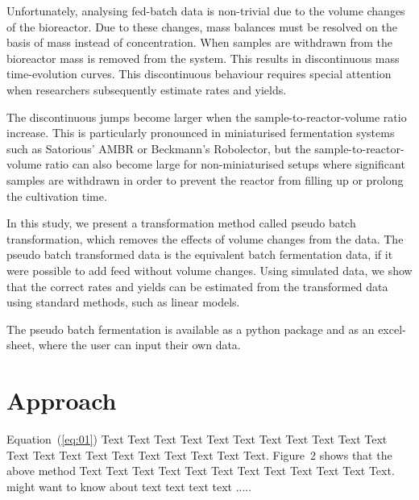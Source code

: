 \documentclass{bioinfo}
\begin{document}
Unfortunately, analysing fed-batch data is non-trivial due to the volume changes of the bioreactor. Due to these changes, mass balances must be resolved on the basis of mass instead of concentration. When samples are withdrawn from the bioreactor mass is removed from the system. This results in discontinuous mass time-evolution curves. This discontinuous behaviour requires special attention when researchers subsequently estimate rates and yields.

The discontinuous jumps become larger when the sample-to-reactor-volume ratio increase. This is particularly pronounced in miniaturised fermentation systems such as Satorious' AMBR or Beckmann's Robolector, but the sample-to-reactor-volume ratio can also become large for non-miniaturised setups where significant samples are withdrawn in order to prevent the reactor from filling up or prolong the cultivation time.

In this study, we present a transformation method called pseudo batch transformation, which removes the effects of volume changes from the data. The pseudo batch transformed data is the equivalent batch fermentation data, if it were possible to add feed without volume changes. Using simulated data, we show that the correct rates and yields can be estimated from the transformed data using standard methods, such as linear models.

The pseudo batch fermentation is available as a python package and as an excel-sheet, where the user can input their own data.





\section{Approach}

Equation~(\ref{eq:01}) Text Text Text Text Text Text  Text Text
Text Text Text Text Text Text Text Text Text Text Text Text Text.
Figure~2\vphantom{\ref{fig:02}} shows that the above method  Text
Text Text Text  Text Text Text Text Text Text  Text Text.
\citealp{Boffelli03} might want to know about text text text text
.....
\end{document}
